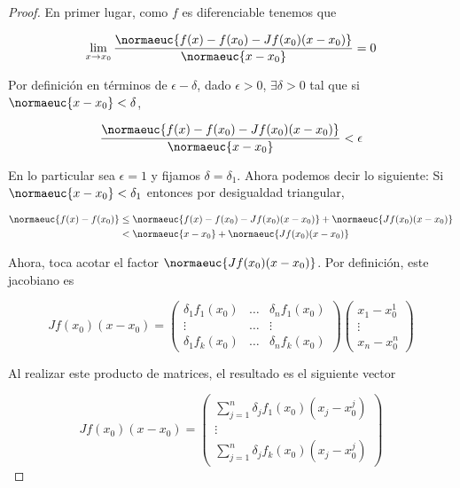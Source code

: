 \begin{proof}
    En primer lugar, como $f$ es diferenciable tenemos que
    
    \[
    \lim_{x \to x_0} \frac{\normaeuc{f(x) - f(x_0) - Jf(x_0)(x - x_0)}}{\normaeuc{x - x_0}} = 0
    \]
    
    Por definición en términos de $\epsilon - \delta$, dado $\epsilon > 0$, $\exists \delta > 0$ tal que si $\normaeuc{x-x_0} < \delta$,
    
    \[
    \frac{\normaeuc{f(x) - f(x_0) - Jf(x_0)(x - x_0)}}{\normaeuc{x - x_0}} < \epsilon
    \]
    
    En lo particular sea $\epsilon = 1$ y fijamos $\delta = \delta_1$. Ahora podemos decir lo siguiente: Si $\normaeuc{x - x_0} < \delta_1$ entonces por desigualdad triangular,
    
    \begin{align*}
        \normaeuc{f(x) - f(x_0)} &\leq \normaeuc{f(x) - f(x_0) - Jf(x_0)(x-x_0)} + \normaeuc{Jf(x_0)(x-x_0)}\\
            & < \normaeuc{x - x_0} + \normaeuc{Jf(x_0)(x-x_0)}
    \end{align*}
    
    Ahora, toca acotar el factor $\normaeuc{Jf(x_0)(x-x_0)}$. Por definición, este jacobiano es
    
    \[
    Jf(x_0)(x-x_0) =
    \begin{pmatrix}
        \delta_1 f_1 (x_0) & \dots & \delta_n f_1 (x_0) \\
        \vdots             & \dots & \vdots             \\
        \delta_1 f_k (x_0) & \dots & \delta_n f_k (x_0)
    \end{pmatrix}
    \begin{pmatrix}
        x_1-x_0^1 \\
        \vdots    \\
        x_n-x_0^n
    \end{pmatrix}
    \]
    
    Al realizar este producto de matrices, el resultado es el siguiente vector
    
    \[
    Jf(x_0)(x-x_0) =
    \begin{pmatrix}
        \sum_{j=1}^n \delta_j f_1 (x_0) (x_j - x_0^j) \\
        \vdots \\
        \sum_{j=1}^n \delta_j f_k (x_0) (x_j - x_0^j)
    \end{pmatrix}
    \]
    

\end{proof}
